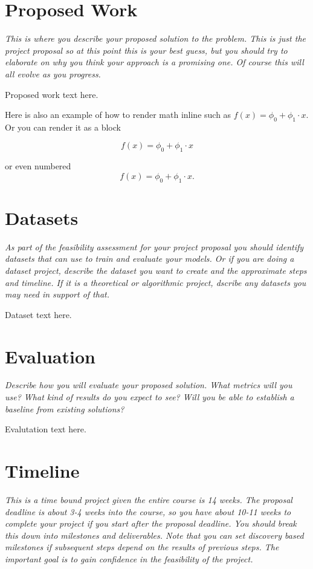 \documentclass[11pt, oneside]{article}   	%
\begin{document}
\section*{Proposed Work}

\textit{This is where you describe your proposed solution to the problem.
	This is just the project proposal so at this point this is your best
	guess, but you should try to elaborate on why you think your approach is
	a promising one. Of course this will all evolve as you progress.}

Proposed work text here.

Here is also an example of how to render math inline
such as \(f(x) = \phi_0 + \phi_1 \cdot x\). Or you can render it as a block

\[
	f(x) = \phi_0 + \phi_1 \cdot x
\]

or even numbered
\begin{equation}
	f(x) = \phi_0 + \phi_1 \cdot x.
\end{equation}

\section*{Datasets}

\textit{As part of the feasibility assessment for your project proposal
	you should identify datasets that can use to train and evaluate your
	models. Or if you are doing a dataset project, describe the dataset you
	want to create and the approximate steps and timeline. If it is a theoretical
	or algorithmic project, dscribe any datasets you may need in support of
	that.}

Dataset text here.

\section*{Evaluation}

\textit{Describe how you will evaluate your proposed solution. What metrics
	will you use? What kind of results do you expect to see? Will you be able
	to establish a baseline from existing solutions?}

Evalutation text here.

\section*{Timeline}

\textit{This is a time bound project given the entire course is 14 weeks.
	The proposal deadline is about 3-4 weeks into the course, so you have
	about 10-11 weeks to complete your project if you start after the proposal
	deadline. You should break this down into
	milestones and deliverables. Note that you can set discovery based milestones if
	subsequent steps depend on the results of previous steps. The important
	goal is to gain confidence in the feasibility of the project.}
\end{document}

